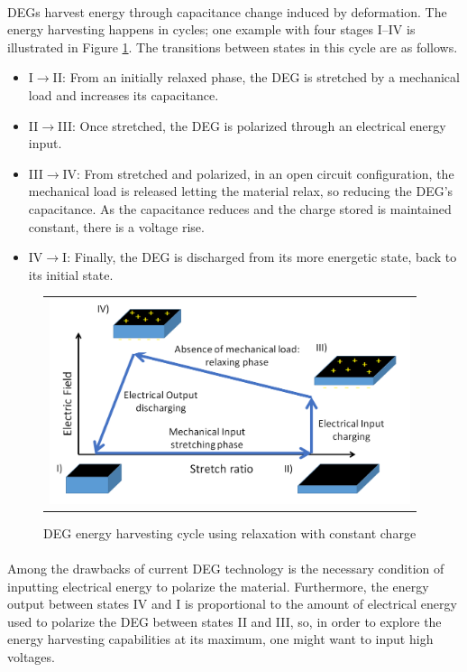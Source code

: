 \paragraph{} DEGs harvest energy through capacitance change induced by  deformation. The energy harvesting happens in cycles; one example with four stages I--IV is illustrated in Figure \ref{fig:cycle}. The transitions between states in this cycle are as follows.
\begin{itemize}
\item I$\rightarrow$II: From an initially relaxed phase, the DEG is stretched by a mechanical load and increases its capacitance.
\item II$\rightarrow$III: Once stretched, the DEG is polarized through an electrical energy input.
\item III$\rightarrow$IV: From stretched and polarized, in an open circuit configuration, the mechanical load is released letting the material relax, so reducing the DEG's capacitance. As the capacitance reduces and the charge stored is maintained constant, there is a voltage rise.
\item IV$\rightarrow$I: Finally, the DEG is discharged from its more energetic state, back to its initial state.
\end{itemize}

\begin{figure}[ht]
\begin{center}
\begin{tabular}{c}
\includegraphics[height=6cm]{fig03/Cycle.png}
\end{tabular}
\end{center}
\caption 
{ \label{fig:cycle}
DEG energy harvesting cycle using relaxation with constant charge} 
\end{figure} 

\paragraph{} Among the drawbacks of current DEG technology is the necessary condition of inputting electrical energy to polarize the material. Furthermore, the energy output between states IV and I is proportional to the amount of electrical energy used to polarize the DEG between states II and III\cite{DEGCycles}, so, in order to explore the energy harvesting capabilities at its maximum, one might want to input high voltages.

